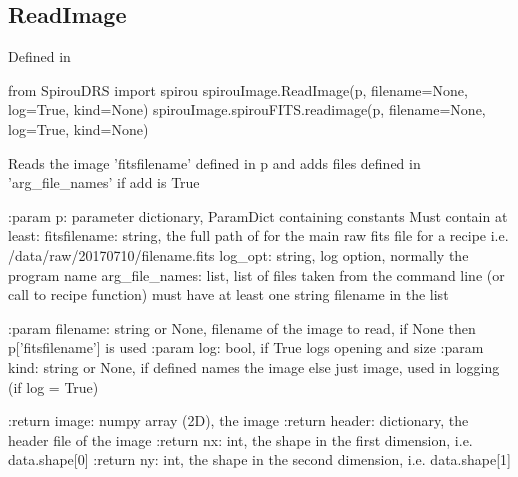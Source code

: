 \begin{minipage}{\textwidth}
\subsection{ReadImage}

Defined in \spirouImage{}

\begin{pythonbox}
from SpirouDRS import spirou
spirouImage.ReadImage(p, filename=None, log=True, kind=None)
spirouImage.spirouFITS.readimage(p, filename=None, log=True, kind=None)
\end{pythonbox}

\begin{pythondocstring}
Reads the image 'fitsfilename' defined in p and adds files defined in
'arg_file_names' if add is True

:param p: parameter dictionary, ParamDict containing constants
    Must contain at least:
            fitsfilename: string, the full path of for the main raw fits
                  file for a recipe
                  i.e. /data/raw/20170710/filename.fits
            log_opt: string, log option, normally the program name
            arg_file_names: list, list of files taken from the command line
                            (or call to recipe function) must have at least
                            one string filename in the list

:param filename: string or None, filename of the image to read, if None
                 then p['fitsfilename'] is used
:param log: bool, if True logs opening and size
:param kind: string or None, if defined names the image else just image,
             used in logging (if log = True)

:return image: numpy array (2D), the image
:return header: dictionary, the header file of the image
:return nx: int, the shape in the first dimension, i.e. data.shape[0]
:return ny: int, the shape in the second dimension, i.e. data.shape[1]
\end{pythondocstring}
\end{minipage}


